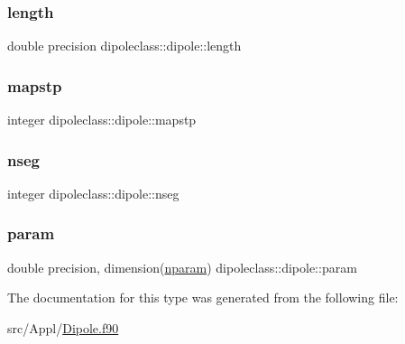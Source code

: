 \subsubsection{\texorpdfstring{length}{length}}
{\footnotesize\ttfamily double precision dipoleclass\+::dipole\+::length}

\mbox{\label{structdipoleclass_1_1dipole_af0a1da636573d6878f6d1c11d0c9e5ab}} 
\subsubsection{\texorpdfstring{mapstp}{mapstp}}
{\footnotesize\ttfamily integer dipoleclass\+::dipole\+::mapstp}

\mbox{\label{structdipoleclass_1_1dipole_a5f280e96dab020ba48b5b28f47b0d5fa}} 
\subsubsection{\texorpdfstring{nseg}{nseg}}
{\footnotesize\ttfamily integer dipoleclass\+::dipole\+::nseg}

\mbox{\label{structdipoleclass_1_1dipole_a5ce0b668334f66ce50e3852ce17ddc39}} 
\subsubsection{\texorpdfstring{param}{param}}
{\footnotesize\ttfamily double precision, dimension(\mbox{\hyperlink{namespacedipoleclass_abc619199e1e9a2811da9e97630125da3}{nparam}}) dipoleclass\+::dipole\+::param}



The documentation for this type was generated from the following file\+:\begin{DoxyCompactItemize}
\item 
src/\+Appl/\mbox{\hyperlink{_dipole_8f90}{Dipole.\+f90}}\end{DoxyCompactItemize}
